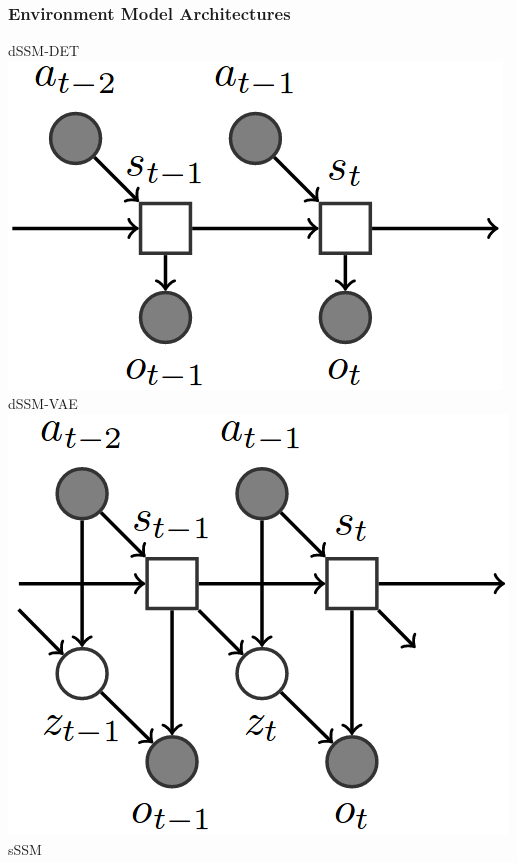 \begin{frame}
	\frametitle{Environment Model Architectures}
	\begin{multicols}{3}
	dSSM-DET\\
	\includegraphics[width=\columnwidth]{./latent_i2a_images/dSSM_DET_architecture.png}
	\columnbreak
	dSSM-VAE\\
	\includegraphics[width=\columnwidth]{./latent_i2a_images/dSSM_VAE_architecture.png}
	\columnbreak
	sSSM \\

\end{multicols}
\end{frame}
